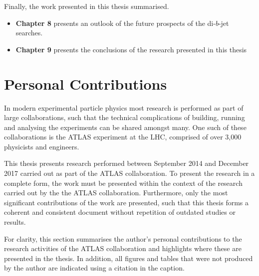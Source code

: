 \noindent
  Finally, the work presented in this thesis summarised.
  \begin{itemize}[leftmargin=*]
\item\textbf{Chapter 8} presents an outlook of the future prospects of the di-$b$-jet searches.\vspace{0.5em}
\item\textbf{Chapter 9} presents the conclusions of the research presented in this thesis\vspace{0.5em}
\end{itemize}
\clearpage
\section{Personal Contributions}

In modern experimental particle physics most research is performed as part of large collaborations,
such that the technical complications of building, running and analysing the experiments can be shared amongst many.
One such of these collaborations is the ATLAS experiment at the LHC, comprised of over 3,000 physicists and engineers.

This thesis presents research performed between September 2014 and December 2017 carried out as part of the ATLAS collaboration.
To present the research in a complete form, the work must be presented within the context of the research carried out by the the ATLAS collaboration.
Furthermore, only the most significant contributions of the work are presented,
such that this thesis forms a coherent and consistent document without repetition of outdated studies or results.

For clarity, this section summarises the author's personal contributions to the research activities of the ATLAS collaboration
and highlights where these are presented in the thesis.
In addition, all figures and tables that were not produced by the author are indicated using a citation in the caption.


